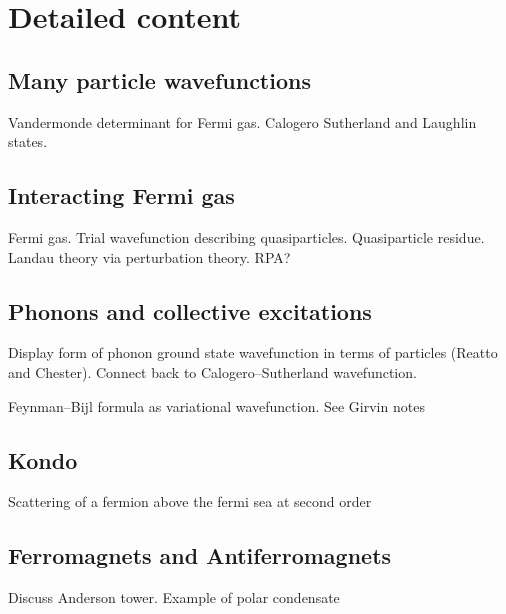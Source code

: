 \section{Detailed content}

\subsection{Many particle wavefunctions}

Vandermonde determinant for Fermi gas. Calogero Sutherland and Laughlin states.

\subsection{Interacting Fermi gas}

Fermi gas. Trial wavefunction describing quasiparticles. Quasiparticle residue. Landau theory via perturbation theory. RPA?

\subsection{Phonons and collective excitations}

Display form of phonon ground state wavefunction in terms of particles (Reatto and Chester). Connect back to Calogero--Sutherland wavefunction. 

Feynman--Bijl formula as variational wavefunction. See Girvin notes

\subsection{Kondo}

Scattering of a fermion above the fermi sea at second order

\subsection{Ferromagnets and Antiferromagnets}

Discuss Anderson tower. Example of polar condensate